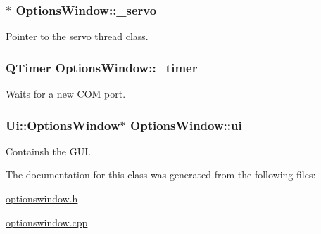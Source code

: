 \hypertarget{a00005_acba1566fea3f831000d5e1c1edc3e776}{}
\subsubsection[{\+\_\+servo}]{$\ast$ Options\+Window\+::\+\_\+servo\hspace{0.3cm}{\ttfamily [private]}}\label{a00005_acba1566fea3f831000d5e1c1edc3e776}


Pointer to the servo thread class. 

\hypertarget{a00005_af6320942b8558140989f552b3bbc1fbd}{}
\subsubsection[{\+\_\+timer}]{\setlength{\rightskip}{0pt plus 5cm}Q\+Timer Options\+Window\+::\+\_\+timer\hspace{0.3cm}{\ttfamily [private]}}\label{a00005_af6320942b8558140989f552b3bbc1fbd}


Waits for a new C\+O\+M port. 

\hypertarget{a00005_a8347442d5b3b670e8fff0c4102db1f88}{}
\subsubsection[{ui}]{\setlength{\rightskip}{0pt plus 5cm}Ui\+::\+Options\+Window$\ast$ Options\+Window\+::ui\hspace{0.3cm}{\ttfamily [private]}}\label{a00005_a8347442d5b3b670e8fff0c4102db1f88}


Containsh the G\+U\+I. 



The documentation for this class was generated from the following files\+:\begin{DoxyCompactItemize}
\item 
\hyperlink{a00018}{optionswindow.\+h}\item 
\hyperlink{a00017}{optionswindow.\+cpp}\end{DoxyCompactItemize}
